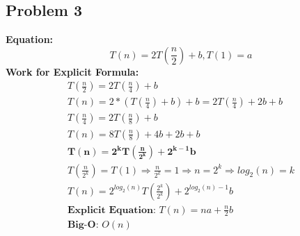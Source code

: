 \documentclass[a4paper,11pt]{article}
\begin{document}
	\subsection{Problem 3}
	\textbf{Equation:}\\
	\begin{equation*}
		T(n)=2T(\frac{n}{2})+b,T(1)=a
	\end{equation*}
	\textbf{Work for Explicit Formula:}\\
	\begin{gather*}
		T(\frac{n}{2}) = 2T(\frac{n}{4})+b\\
		T(n)=2*(T(\frac{n}{4})+b)+b=2T(\frac{n}{4})+2b+b\\
		T(\frac{n}{4}) = 2T(\frac{n}{8})+b\\
		T(n)=8T(\frac{n}{8})+4b+2b+b\\
		\mathbf{T(n)=2^kT(\frac{n}{2^k})+2^{k-1}b}\\
		T(\frac{n}{2^k})=T(1) \Rightarrow \frac{n}{2^k}=1 \Rightarrow n = 2^k \Rightarrow log_2(n)=k\\
		T(n)=2^{log_2(n)}T(\frac{2^k}{2^k})+2^{log_2(n)-1}b\\
		\textbf{Explicit Equation: }T(n)=na+\frac{n}{2}b\\
		\textbf{Big-O: }O(n)
	\end{gather*}
\end{document}
